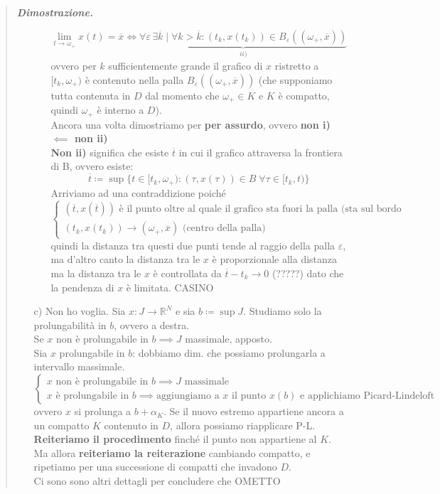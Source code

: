 \documentclass[a4paper,10pt]{article}
\newcommand{\re}{\mathbb{R}} %
\theoremstyle{indentdefinition}
\theoremstyle{indenttheorem}
\theoremstyle{myremark}
\theoremstyle{indentgeneral}
\newenvironment{dimo}{\begin{quote}\textit{\textbf{Dimostrazione.}}}{\end{quote}} %
\begin{document}
\begin{dimo}
\begin{itemize}
\begin{itemize}
            $$ \lim_{t\to\omega_+}x(t)=\overline{x}\iff \underbrace{\forall\varepsilon\,\exists\overline{k}\mid\forall k>\overline{k}: (t_k,x(t_k))\in B_\varepsilon((\omega_+,\overline{x}))}_{ii)}$$
            ovvero per $k$ sufficientemente grande il grafico di $x$ ristretto a $[t_k, \omega_+)$ è contenuto nella palla $B_\varepsilon((\omega_+,\overline{x}))$ (che supponiamo tutta contenuta in $D$ dal momento che $\omega_+\in K$ e $K$ è compatto, quindi $\omega_+$ è interno a $D$). \\
            Ancora una volta dimostriamo per \textbf{per assurdo}, ovvero \textbf{non i) $\impliedby$ non ii)} \\
           \textbf{ Non ii)} significa che esiste $\overline{t}$ in cui il grafico attraversa la frontiera di B, ovvero esiste:
            $$\overline{t}\coloneqq\sup\{t\in[t_k,\omega_+): (\tau,x(\tau))\in B\; \forall\tau\in[t_k,t)\}$$
            Arriviamo ad una contraddizione poiché
           $$ \begin{cases}
                (\overline{t},x(\overline{t})) \text{ è il punto oltre al quale il grafico sta fuori la palla (sta sul bordo della palla)} \\
                (t_k,x(t_k))\to(\omega_+,\overline{x}) \text{ (centro della palla)}
            \end{cases}$$
            quindi la distanza tra questi due punti tende al raggio della palla $\varepsilon$, ma d'altro canto la distanza tra le $x$ è proporzionale alla distanza ma la distanza tra le $x$ è controllata da $\overline{t}-t_k\to 0$  (?????) dato  che la pendenza di $x$ è limitata.
            CASINO
            
                    
        \end{itemize}
        \item[c)] Non ho voglia. Sia $x:J\to\re^N$ e sia $b\coloneqq\sup J$. Studiamo solo la prolungabilità in $b$, ovvero a destra. \\
        Se $x$ non è prolungabile in $b\implies J$ massimale, apposto. \\
        Sia $x$ prolungabile in $b$: dobbiamo dim. che possiamo prolungarla a intervallo massimale.
        $$\begin{cases}
            x \text{  non è prolungabile in }b \implies J \text{ massimale} \\
             x \text{   è prolungabile in }b \implies \text{aggiungiamo a $x$ il punto $x(b)$ e applichiamo Picard-Lindeloft}
        \end{cases}$$
        ovvero $x$ si prolunga a $b+\alpha_K$. Se il nuovo estremo appartiene ancora a un compatto  $K$ contenuto in $D$, allora possiamo riapplicare P-L. \textbf{Reiteriamo il procedimento} finché il punto non appartiene al $K$. Ma allora \textbf{reiteriamo la reiterazione} cambiando compatto, e ripetiamo per una successione di compatti che invadono $D$. \\ 
        Ci sono sono altri dettagli per concludere che OMETTO
    \end{itemize}
\end{dimo}
\end{document}

